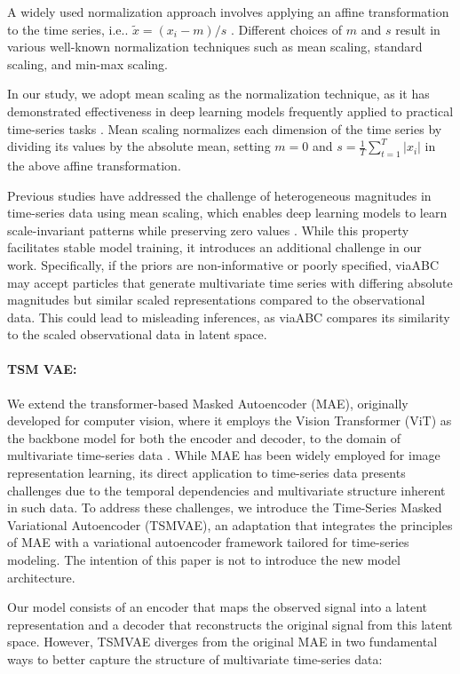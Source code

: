 \documentclass[12pt]{article} %
\newcommand{\para}[1]{\vspace*{-4.5mm}\paragraph{#1}}
\begin{document}
A widely used normalization approach involves applying an affine transformation to the time series, i.e.. $\tilde{x} = {(x_i - m)}/{s}$ \citep{rabanser2020effectiveness}\citep{ansari2024chronos}. Different choices of $m$ and $s$ result in  various well-known normalization techniques such as mean scaling, standard scaling, and min-max scaling.

In our study, we adopt mean scaling as the normalization technique, as it has demonstrated effectiveness in deep learning models frequently applied to practical time-series tasks \citep{salinas2020deepar}\citep{rabanser2020effectiveness} \citep{ansari2024chronos}. Mean scaling normalizes each dimension of the time series by dividing its values by the absolute mean, setting $m = 0$ and $s= \frac{1}{T} \sum_{t=1}^{T}|x_i|$ in the above affine transformation. 

Previous studies have addressed the challenge of heterogeneous magnitudes in time-series data using mean scaling, which enables deep learning models to learn scale-invariant patterns while preserving zero values \citep{ansari2024chronos}. While this property facilitates stable model training, it introduces an additional challenge in our work. Specifically, if the priors are non-informative or poorly specified, viaABC may accept particles that generate multivariate time series with differing absolute magnitudes but similar scaled representations compared to the observational data. This could lead to misleading inferences, as viaABC compares its similarity to the scaled observational data in latent space. 


\para{TSM VAE:}
We extend the transformer-based Masked Autoencoder (MAE), originally developed for computer vision, where it employs the Vision Transformer (ViT) as the backbone model for both the encoder and decoder, to the domain of multivariate time-series data \citep{dosovitskiy2020image, he2022masked}.
While MAE has been widely employed for image representation learning, its direct application to time-series data presents challenges due to the temporal dependencies and multivariate structure inherent in such data.
To address these challenges, we introduce the Time-Series Masked Variational Autoencoder (TSMVAE), an adaptation that integrates the principles of MAE with a variational autoencoder framework tailored for time-series modeling.
The intention of this paper is not to introduce the new model architecture.

Our model consists of an encoder that maps the observed signal into a latent representation and a decoder that reconstructs the original signal from this latent space. However, TSMVAE diverges from the original MAE in two fundamental ways to better capture the structure of multivariate time-series data:
\end{document}
